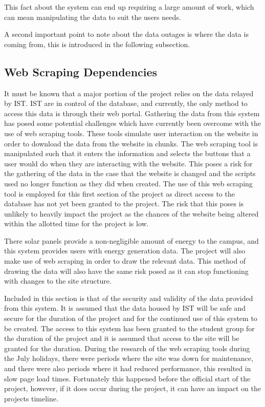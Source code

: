 \documentclass[12pt,onecolumn]{IEEEtran}
\begin{document}
This fact about the system can end up requiring a large amount of work, which can mean manipulating the data to suit the users needs.

A second important point to note about the data outages is where the data is coming from, this is introduced in the following subsection.

\subsection{Web Scraping Dependencies} \label{sec:WebScrapingDependencies}
It must be known that a major portion of the project relies on the data relayed by IST. IST are in control of the database, and currently, the only method to access this data is through their web portal. Gathering the data from this system has posed some potential challenges which have currently been overcome with the use of web scraping tools. 
These tools simulate user interaction on the website in order to download the data from the website in chunks. The web scraping tool is manipulated such that it enters the information and selects the buttons that a user would do when they are interacting with the website. 
This poses a risk for the gathering of the data in the case that the website is changed and the scripts used no longer function as they did when created. 
The use of this web scraping tool is employed for this first section of the project as direct access to the database has not yet been granted to the project. 
The risk that this poses is unlikely to heavily impact the project as the chances of the website being altered within the allotted time for the project is low.

There solar panels provide a non-negligible amount of energy to the campus, and this system provides users with energy generation data. The project will also make use of web scraping in order to draw the relevant data. This method of drawing the data will also have the same risk posed as it can stop functioning with changes to the site structure.

Included in this section is that of the security and validity of the data provided from this system. It is assumed that the data housed by IST will be safe and secure for the duration of the project and for the continued use of this system to be created. 
The access to this system has been granted to the student group for the duration of the project and it is assumed that access to the site will be granted for the duration.
During the research of the web scraping tools during the July holidays, there were periods where the site was down for maintenance, and there were also periods where it had reduced performance, this resulted in slow page load times. Fortunately this happened before the official start of the project, however, if it does occur during the project, it can have an impact on the projects timeline.
\end{document}
